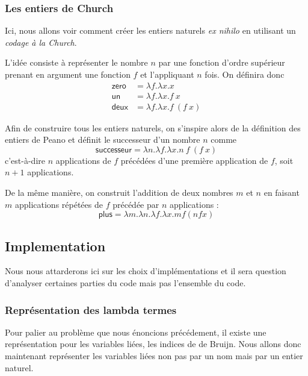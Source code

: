 \documentclass {article}
\theoremstyle{definition}
\theoremstyle{remark}
\begin{document}
\subsubsection{Les entiers de Church}

Ici, nous allons voir comment créer
les entiers naturels \textit{ex nihilo} en utilisant un \emph{codage à
  la Church}.

L'idée consiste à représenter le nombre \(n\) par une fonction d'ordre
supérieur prenant en argument une fonction \(f\) et l'appliquant \(n\)
fois. On définira donc 
%
\begin{align*}
\mathsf{zero} &= \lambda f. \lambda x. x \\
\mathsf{un}   &= \lambda f. \lambda x. f\: x \\
\mathsf{deux} &= \lambda f. \lambda x. f\: (f\: x)
\end{align*}

Afin de construire tous les entiers naturels, on s'inspire alors de la
définition des entiers de Peano et définit le successeur d'un nombre \(n\)
comme
%
\[
\mathsf{successeur} = \lambda n. \lambda f. \lambda x. n\: f\: (f\: x)
\]
%
c'est-à-dire \(n\) applications de \(f\) précédées d'une première
application de \(f\), soit \(n+1\) applications.

De la même manière, on construit l'addition de deux nombres \(m\) et
\(n\) en faisant \(m\) applications répétées de \(f\) précédée par
\(n\) applications :
%
\[
\mathsf{plus} = \lambda m. \lambda n. \lambda f. \lambda x. m f (n f x)
\]


\subsection{Implementation}

Nous nous attarderons ici sur les choix d'implémentations et il sera question
d'analyser certaines parties du code mais pas l'ensemble du code.

\subsubsection{Représentation des lambda termes}
 
Pour palier au problème que nous énoncions précédement, il existe une 
représentation pour les variables liées, les indices de de Bruijn.
Nous allons donc maintenant représenter les variables liées non pas par un 
nom mais par un entier naturel. 
\end{document}
